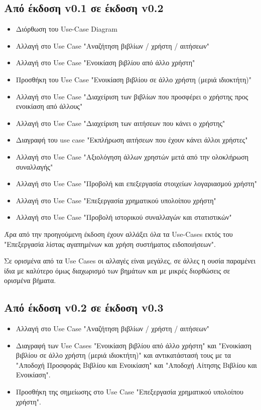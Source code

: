 \documentclass[12pt,a4paper]{article}
\begin{document}
\subsection{Από έκδοση v0.1 σε έκδοση v0.2}
\begin{itemize}
    \item Διόρθωση του Use-Case Diagram
    \item Αλλαγή στο Use Case "Αναζήτηση βιβλίων / χρήστη / αιτήσεων"
    \item Αλλαγή στο Use Case "Ενοικίαση βιβλίου από άλλο χρήστη"
    \item Προσθήκη του Use Case "Ενοικίαση βιβλίου σε άλλο χρήστη (μεριά ιδιοκτήτη)"
    \item Αλλαγή στο Use Case "Διαχείριση των βιβλίων που προσφέρει ο χρήστης προς ενοικίαση από άλλους"
    \item Αλλαγή στο Use Case "Διαχείριση των αιτήσεων που κάνει ο χρήστης"
    \item Διαγραφή του use case "Εκπλήρωση αιτήσεων που έχουν κάνει άλλοι χρήστες"
    \item Αλλαγή στο Use Case "Αξιολόγηση άλλων χρηστών μετά από την ολοκλήρωση συναλλαγής"
    \item Αλλαγή στο Use Case "Προβολή και επεξεργασία στοιχείων λογαριασμού χρήστη"
    \item Αλλαγή στο Use Case "Επεξεργασία χρηματικού υπολοίπου χρήστη"
    \item Αλλαγή στο Use Case "Προβολή ιστορικού συναλλαγών και στατιστικών"
\end{itemize}
Άρα από την προηγούμενη έκδοση έχουν αλλάξει όλα τα Use-Cases εκτός του "Επεξεργασία λίστας αγαπημένων και χρήση συστήματος ειδοποιήσεων".

Σε ορισμένα από τα Use Cases οι αλλαγές είναι μεγάλες, σε άλλες η ουσία παραμένει ίδια με καλύτερο όμως διαχωρισμό των βημάτων και με μικρές διορθώσεις σε ορισμένα βήματα.

\subsection{Από έκδοση v0.2 σε έκδοση v0.3}
\begin{itemize}
    \item Αλλαγή στο Use Case "Αναζήτηση βιβλίων / χρήστη / αιτήσεων"
    \item Διαγραφή των Use Cases "Ενοικίαση βιβλίου από άλλο χρήστη" και "Ενοικίαση βιβλίου σε άλλο χρήστη (μεριά ιδιοκτήτη)" και αντικατάστασή τους με τα "Αποδοχή Προσφοράς Βιβλίου και Ενοικίαση" και "Αποδοχή Αίτησης Βιβλίου και Ενοικίαση".
    \item Προσθήκη της σημείωσης στο Use Case "Επεξεργασία χρηματικού υπολοίπου χρήστη".
\end{itemize}
\end{document}
